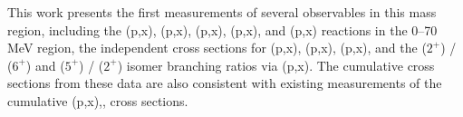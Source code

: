 This work presents the first measurements of several observables in 
this mass region, including the (p,x), (p,x), (p,x),  (p,x), and (p,x) reactions in the 0--70\,MeV region, 
the independent cross sections for       (p,x), (p,x), (p,x), and the  ($2^+$) /   ($6^+$) and  ($5^+$) /   ($2^+$)  isomer branching ratios via (p,x).  
The cumulative cross sections from these data are also consistent with existing measurements of the cumulative (p,x),, cross sections.




